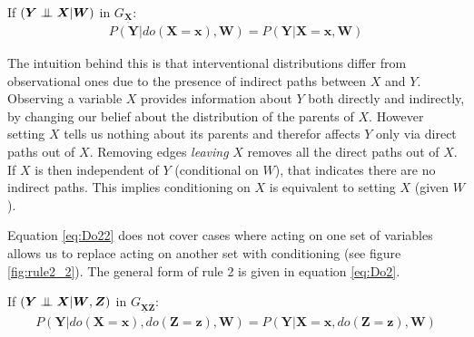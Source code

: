 \documentclass[11pt,a4paper,oneside]{book}
\newcommand{\eqn}[1]{\begin{align}#1\end{align}}
\theoremstyle{plain}
\theoremstyle{definition}
\newcommand{\ci}{\mathrel{\perp\mspace{-10mu}\perp}}
\begin{document}
If  $(\boldsymbol{Y} \ci \boldsymbol{X}|\boldsymbol{W})$ in $G_{\underline{\boldsymbol{X}}}$:
\eqn{
\label{eq:Do22}
P(\boldsymbol{Y}|do(\boldsymbol{X}=\boldsymbol{x}),\boldsymbol{W}) = P(\boldsymbol{Y}|\boldsymbol{X}=\boldsymbol{x},\boldsymbol{W})
}

The intuition behind this is that interventional distributions differ from observational ones due to the presence of indirect paths between $X$ and $Y$. Observing a variable $X$ provides information about $Y$ both directly and indirectly, by changing our belief about the distribution of the parents of $X$. However setting $X$ tells us nothing about its parents and therefor affects $Y$ only via direct paths out of $X$. Removing edges \emph{leaving} $X$ removes all the direct paths out of $X$. If $X$ is then independent of $Y$ (conditional on $W$), that indicates there are no indirect paths. This implies conditioning on $X$ is equivalent to setting $X$ (given $W$).

Equation \ref{eq:Do22} does not cover cases where acting on one set of variables allows us to replace acting on another set with conditioning (see figure \ref{fig:rule2_2}). The general form of rule 2 is given in equation \ref{eq:Do2}.

If  $(\boldsymbol{Y} \ci \boldsymbol{X}|\boldsymbol{W},\boldsymbol{Z})$ in $G_{\underline{\boldsymbol{X}}\overline{\boldsymbol{Z}}}$:
\eqn{
\label{eq:Do2}
P(\boldsymbol{Y}|do(\boldsymbol{X}=\boldsymbol{x}),
do(\boldsymbol{Z}=\boldsymbol{z}),
\boldsymbol{W}) = P(\boldsymbol{Y}|\boldsymbol{X}=\boldsymbol{x},do(\boldsymbol{Z}=\boldsymbol{z}),\boldsymbol{W})
}
\end{document}
